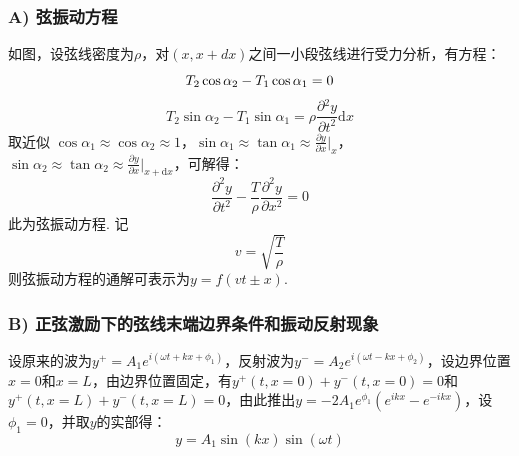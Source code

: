 \documentclass[UTF8]{ctexart}
\begin{document}
\subsubsection*{A) 弦振动方程}
\begin{figure}[H]\centering{}
\end{figure}
\songti 如图，设弦线密度为$\rho$，对$(x,x+dx)$之间一小段弦线进行受力分析，有方程：
\begin{equation}
T_2\cos\alpha_2-T_1\cos\alpha_1 = 0\\
\end{equation}
\begin{equation}
T_2\sin\alpha_2-T_1\sin\alpha_1 = \rho
{\frac{\partial {}^2y}{\partial t^2}} \mathrm{d}x
\end{equation}
\songti 取近似 $\cos\alpha_1 \approx \cos\alpha_2 \approx 1$，$\sin\alpha_1 \approx \tan\alpha_1 \approx \displaystyle{\frac{\partial y}{\partial x}}\Big|_x$，$\sin\alpha_2 \approx \tan\alpha_2 \approx \displaystyle{\frac{\partial y}{\partial x}}\Big|_{x+\mathrm{d}x}$，可解得：
\begin{equation}
\displaystyle{\frac{\partial ^2y}{\partial t^2}-\frac{T}{\rho}\frac{\partial ^2y}{\partial x^2} = 0}
\end{equation}
\songti 此为弦振动方程. 记\begin{equation}\label{velocity}\displaystyle{v=\sqrt{\frac{T}{\rho}}}\end{equation}则弦振动方程的通解可表示为$\displaystyle{y = f(vt\pm x)}$.

\subsubsection*{B) 正弦激励下的弦线末端边界条件和振动反射现象}
\songti 设原来的波为$y^+ = A_1e^{i(\omega t+kx+\phi_1)}$，反射波为$y^-=A_2e^{i(\omega t-kx+\phi_2)}$，设边界位置$x = 0$和$x = L$，由边界位置固定，有$y^+(t,x = 0)+y^-(t,x = 0) = 0$和$y^+(t,x = L)+y^-(t,x = L) = 0$，由此推出$y = -2A_1e^{\phi_1}(e^{ikx}-e^{-ikx})$，设$\phi_1 = 0$，并取$y$的实部得：
\begin{equation}
y = A_1\sin(kx)\sin(\omega t)
\end{equation}
\end{document}

